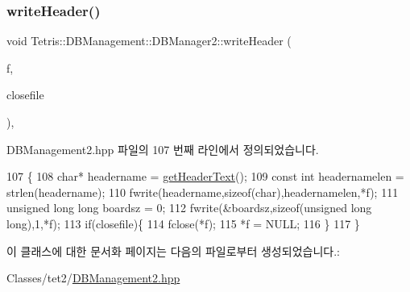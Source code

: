 \subsubsection{\texorpdfstring{write\+Header()}{writeHeader()}}
{\footnotesize\ttfamily void Tetris\+::\+D\+B\+Management\+::\+D\+B\+Manager2\+::write\+Header (\begin{DoxyParamCaption}\item[{F\+I\+LE $\ast$$\ast$}]{f,  }\item[{bool}]{closefile }\end{DoxyParamCaption})\hspace{0.3cm}{\ttfamily [inline]}, {\ttfamily [protected]}}



D\+B\+Management2.\+hpp 파일의 107 번째 라인에서 정의되었습니다.


\begin{DoxyCode}
107                                                      \{
108                 \textcolor{keywordtype}{char}* headername = \hyperlink{class_tetris_1_1_d_b_management_1_1_d_b_manager2_a80b688a47f643121f2391f858d61ea13}{getHeaderText}();
109                 \textcolor{keyword}{const} \textcolor{keywordtype}{int} headernamelen = strlen(headername);
110                 fwrite(headername,\textcolor{keyword}{sizeof}(\textcolor{keywordtype}{char}),headernamelen,*f);
111                 \textcolor{keywordtype}{unsigned} \textcolor{keywordtype}{long} \textcolor{keywordtype}{long} boardsz = 0;
112                 fwrite(&boardsz,\textcolor{keyword}{sizeof}(\textcolor{keywordtype}{unsigned} \textcolor{keywordtype}{long} \textcolor{keywordtype}{long}),1,*f);
113                 \textcolor{keywordflow}{if}(closefile)\{
114                     fclose(*f);
115                     *f = NULL;
116                 \}
117             \}
\end{DoxyCode}


이 클래스에 대한 문서화 페이지는 다음의 파일로부터 생성되었습니다.\+:\begin{DoxyCompactItemize}
\item 
Classes/tet2/\hyperlink{_d_b_management2_8hpp}{D\+B\+Management2.\+hpp}\end{DoxyCompactItemize}
